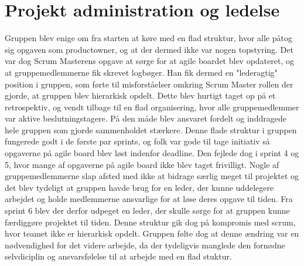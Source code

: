 \section{Projekt administration og ledelse}
Gruppen blev enige om fra starten at køre med en flad struktur, hvor alle påtog sig opgaven som productowner, og at der dermed ikke var nogen topstyring. Det var dog Scrum Masterens opgave at sørge for at agile boardet blev opdateret, og at gruppemedlemmerne fik skrevet logbøger. Han fik dermed en "lederagtig" position i gruppen, som førte til misforståelser omkring Scrum Master rollen der gjorde, at gruppen blev hierarkisk opdelt. Dette blev hurtigt taget op på et retrospektiv, og vendt tilbage til en flad organisering, hvor alle gruppemedlemmer var aktive beslutningstagere. På den måde blev ansvaret fordelt og inddragede hele gruppen som gjorde sammenholdet stærkere. Denne flade struktur i gruppen fungerede godt i de første par sprints, og folk var gode til tage initiativ så opgaverne på agile board blev løst indenfor deadline. Den fejlede dog i sprint 4 og 5, hvor mange af opgaverne på agile board ikke blev taget frivilligt. Nogle af gruppemedlemmerne slap afsted med ikke at bidrage særlig meget til projektet og det blev tydeligt at gruppen havde brug for en leder, der kunne uddelegere arbejdet og holde medlemmerne ansvarlige for at løse deres opgave til tiden. Fra sprint 6 blev der derfor udpeget en leder, der skulle sørge for at gruppen kunne færdiggøre projektet til tiden. Denne struktur gik dog på kompromis med scrum, hvor teamet ikke er hierarkisk opdelt. Gruppen følte dog at denne ændring var en nødvendighed for det videre arbejde, da der tydeligvis manglede den fornødne selvdiciplin og ansvarsfølelse til at arbejde med en flad stuktur.

